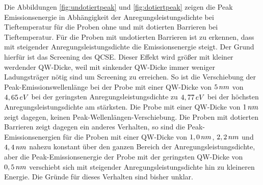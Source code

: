 \noindent 
% 
Die Abbildungen \ref{fig:undotiertpeak} und \ref{fig:dotiertpeak} zeigen die Peak Emissionsenergie in Abhängigkeit der Anregungsleistungsdichte bei Tieftemperatur für die Proben ohne und mit dotierten Barrieren bei Tieftemperatur. Für die Proben mit undotierten Barrieren ist zu erkennen, dass mit steigender Anregungsleistungsdichte die Emissionsenergie steigt. Der Grund hierfür ist das Screening des QCSE. Dieser Effekt wird größer mit kleiner werdender QW-Dicke, weil mit sinkender QW-Dicke immer weniger Ladungsträger nötig sind um Screening zu erreichen. So ist die Verschiebung der Peak-Emissionswellenlänge bei der Probe mit einer QW-Dicke von $5 \thinspace nm$ von $4,65 \thinspace eV$ bei der geringsten Anregungsleistungsdichte zu $4,77 \thinspace eV$ bei der höchsten Anregungsleistungsdichte am stärksten. Die Probe mit einer QW-Dicke von $1 \thinspace nm$ zeigt dagegen, keinen Peak-Wellenlängen-Verschiebung. 
Die Proben mit dotierten Barrieren zeigt dagegen ein anderes Verhalten, so sind die Peak-Emissionsenergien für die Proben mit einer QW-Dicke von 
$1,0 \thinspace nm$, $2,2 \thinspace nm$ und $4,4 \thinspace nm$ nahezu konstant über den ganzen Bereich der Anregungsleistungsdichte, aber die Peak-Emissionsenergie der Probe mit der geringsten QW-Dicke von $0,5 \thinspace nm$ verschiebt sich mit steigender Anregungsleistungsdichte hin zu kleineren Energie. Die Gründe für dieses Verhalten sind bisher unklar.
%

